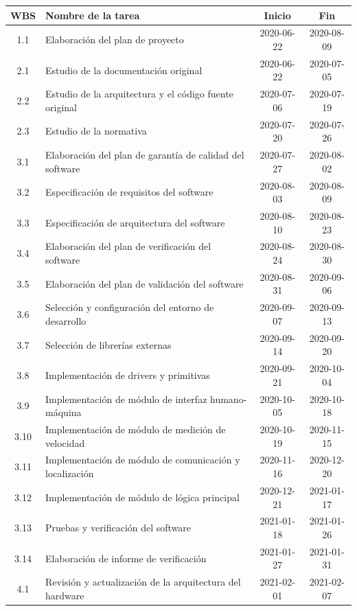 \documentclass[11pt]{charter}
\begin{document}
\begin{table}[htpb]
  \centering
  \begin{tabularx}{\linewidth}{@{}|c|X|c|c|@{}}
  \hline
  \rowcolor[HTML]{C0C0C0} 
  WBS & Nombre de la tarea & Inicio & Fin \\ \hline
  1.1 & Elaboración del plan de proyecto & 2020-06-22 & 2020-08-09 \\ \hline
  2.1 & Estudio de la documentación original & 2020-06-22 & 2020-07-05 \\ \hline
  2.2 & Estudio de la arquitectura y el código fuente original & 2020-07-06 & 2020-07-19 \\ \hline
  2.3 & Estudio de la normativa & 2020-07-20 & 2020-07-26 \\ \hline
  3.1 & Elaboración del plan de garantía de calidad del software & 2020-07-27 & 2020-08-02 \\  \hline
  3.2 & Especificación de requisitos del software & 2020-08-03 & 2020-08-09 \\ \hline
  3.3 & Especificación de arquitectura del software & 2020-08-10 & 2020-08-23 \\ \hline
  3.4 & Elaboración del plan de verificación del software & 2020-08-24 & 2020-08-30 \\ \hline
  3.5 & Elaboración del plan de validación del software & 2020-08-31 & 2020-09-06 \\ \hline
  3.6 & Selección y configuración del entorno de desarrollo & 2020-09-07 & 2020-09-13 \\ \hline
  3.7 & Selección de librerías externas & 2020-09-14 & 2020-09-20 \\ \hline
  3.8 & Implementación de drivers y primitivas & 2020-09-21 & 2020-10-04 \\ \hline
  3.9 & Implementación de módulo de interfaz humano-máquina & 2020-10-05 & 2020-10-18 \\ \hline
  3.10 & Implementación de módulo de medición de velocidad & 2020-10-19 & 2020-11-15 \\ \hline
  3.11 & Implementación de módulo de comunicación y localización & 2020-11-16 & 2020-12-20 \\ \hline
  3.12 & Implementación de módulo de lógica principal & 2020-12-21 & 2021-01-17 \\ \hline
  3.13 & Pruebas y verificación del software & 2021-01-18 & 2021-01-26 \\ \hline
  3.14 & Elaboración de informe de verificación & 2021-01-27 & 2021-01-31 \\ \hline
  4.1 & Revisión y actualización de la arquitectura del hardware & 2021-02-01 & 2021-02-07 \\ \hline

\end{tabularx}
\end{table}
\end{document}
